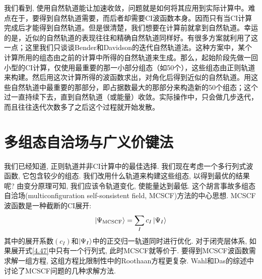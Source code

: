 我们看到, 使用自然轨道能让加速收敛，问题就是如何将其应用到实际计算中。难点在于，要得到自然轨道需要，而后者却需要CI波函数本身。因而只有当CI计算完成后才能得到自然轨道。但是很清楚，我们想要在计算前就拿到自然轨道。幸运的是，近似的自然轨道的表现往往和精确自然轨道同样好。有很多方案就利用了这一点；这里我们只谈谈Bender和Davidson的迭代自然轨道法。这种方案中，某个计算所用的组态由之前的计算中所得的自然轨道来生成。那么，起始阶段先做一回小型的CI计算，仅使用最重要的那一小部分组态（如50个），这些组态由正则\hft 轨道来构建。然后用这次计算所得的波函数求出，对角化后得到近似的自然轨道。用这些自然轨道中最重要的那部分，即占据数最大的那部分来构造新的50个组态；这个过一直持续下去，直到自然轨道（或能量）收敛。实际操作中，只会做几步迭代，而且往往迭代次数多了之后这个过程就开始发散。
\section{多组态自洽场与广义价键法}
\label{sec4.5}
我们已经知道, 
正则\hft 轨道并非CI计算中的最佳选择. 
我们现在考虑一个多行列式波函数, 
它包含较少的组态. 
我们改用什么轨道来构建这些组态, 
以得到最优的结果呢? 由变分原理可知, 
我们应该令轨道变化, 
使能量达到最低. 
这个胡言事故多组态自洽场(multiconfiguration self-sonsistent field, 
MCSCF)方法的中心思想. 
MCSCF波函数是一种截断的CI展开:
\begin{align}
\Ket{\Psi_\mathrm{MCSCF}} = \sum_I c_I\Ket{\Psi_I}
\label{4.47}
\end{align}
其中的展开系数$(c_I)$和$\Ket{\Psi_I}$中的正交归一轨道同时进行优化. 对于闭壳层体系, 如果展开式\eqref{4.47}中只有一个行列式, 此时MCSCF就等价于\hft. 要得到MCSCF波函数需求解一组方程, 这组方程比限制性\hft 中的Roothaan方程更复杂. Wahl和Das的综述中讨论了MCSCF问题的几种求解方法.

